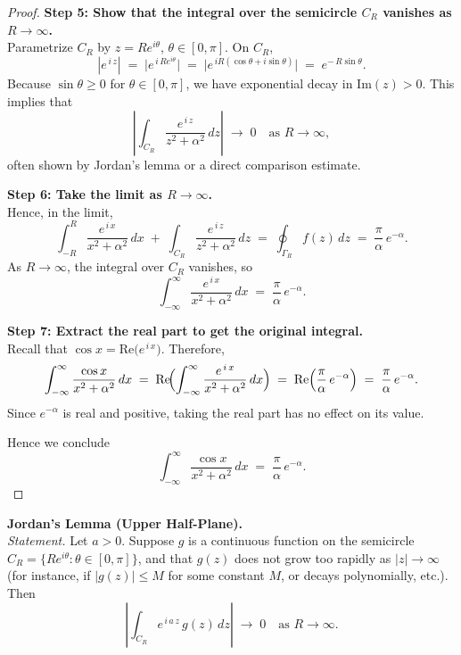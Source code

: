 \documentclass[12pt]{article}
\theoremstyle{definition} %
\theoremstyle{plain} %
\begin{document}
\begin{proof}
\bigskip
\noindent
\textbf{Step 5: Show that the integral over the semicircle $C_R$ vanishes as $R\to\infty$.}\\
Parametrize $C_R$ by $z=Re^{i\theta}$, $\theta\in [0,\pi]$.  On $C_R$,
\[
\left| e^{\,i\,z}\right|
\;=\;
\bigl|e^{\,i\,R e^{i\theta}}\bigr|
\;=\;
\bigl|e^{\,iR(\cos\theta + i\sin\theta)}\bigr|
\;=\;
e^{-\,R\sin\theta}.
\]
Because $\sin\theta\ge0$ for $\theta\in [0,\pi]$, we have exponential decay in $\mathrm{Im}(z)>0$.  This implies that 
\[
\left|\int_{C_R} \frac{e^{\,i\,z}}{z^2+\alpha^2}\,dz\right|
\;\to\;
0
\quad\text{as }R\to\infty,
\]
often shown by Jordan's lemma or a direct comparison estimate.

\bigskip
\noindent
\textbf{Step 6: Take the limit as $R\to \infty$.}\\
Hence, in the limit,
\[
\int_{-R}^R \frac{e^{\,i\,x}}{x^2+\alpha^2}\,dx
\;+\;
\int_{C_R} \frac{e^{\,i\,z}}{z^2+\alpha^2}\,dz
\;=\;
\oint_{\Gamma_R} f(z)\,dz
\;=\;
\frac{\pi}{\alpha}\,e^{-\alpha}.
\]
As $R\to \infty$, the integral over $C_R$ vanishes, so
\[
\int_{-\infty}^{\infty} \frac{e^{\,i\,x}}{x^2 + \alpha^2}\,dx 
\;=\;
\frac{\pi}{\alpha}\,e^{-\alpha}.
\]

\bigskip
\noindent
\textbf{Step 7: Extract the real part to get the original integral.}\\
Recall that $\cos x = \mathrm{Re}\bigl(e^{\,i\,x}\bigr)$.  Therefore,
\[
\int_{-\infty}^{\infty} \frac{\cos x}{x^2 + \alpha^2}\,dx
\;=\;
\mathrm{Re}
\!\Bigl(
\int_{-\infty}^{\infty} \frac{e^{\,i\,x}}{x^2 + \alpha^2}\,dx
\Bigr)
\;=\;
\mathrm{Re}\Bigl(\frac{\pi}{\alpha}\,e^{-\alpha}\Bigr)
\;=\;
\frac{\pi}{\alpha}\,e^{-\alpha}.
\]
Since $e^{-\alpha}$ is real and positive, taking the real part has no effect on its value.  

\bigskip
\noindent
Hence we conclude
\[
\boxed{
\int_{-\infty}^{\infty} \frac{\cos x}{x^2 + \alpha^2}\,dx
\;=\;
\frac{\pi}{\alpha}\,e^{-\alpha}.
}
\]

\end{proof}
\noindent
\textbf{Jordan's Lemma (Upper Half-Plane).}\\[6pt]
\emph{Statement.} 
Let $a>0$. Suppose $g$ is a continuous function on the semicircle 
$C_R = \{R e^{i\theta} : \theta\in[0,\pi]\}$, 
and that $g(z)$ does not grow too rapidly as $|z|\to\infty$ (for instance, if $|g(z)| \le M$ for some constant $M$, or decays polynomially, etc.). 
Then
\[
\left|
\int_{C_R} e^{\,i\,a\,z} \, g(z)\,dz
\right|
\;\longrightarrow\; 0
\quad
\text{as }R\to \infty.
\]
\end{document}
